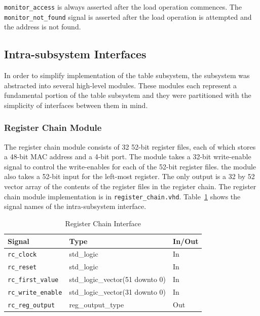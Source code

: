 \documentclass{article}
\begin{document}
\texttt{monitor\_access} is always asserted after the load operation commences. The \texttt{monitor\_not\_found} signal is asserted after the load operation is attempted and the address is not found.

\subsection{Intra-subsystem Interfaces}

In order to simplify implementation of the table subsystem, the subsystem was abstracted into several high-level modules. These modules each represent a fundamental portion of the table subsystem and they were partitioned with the simplicity of interfaces between them in mind. 

\newpage
\subsubsection{Register Chain Module}

The register chain module consists of 32 52-bit register files, each of which stores a 48-bit MAC address and a 4-bit port. The module takes a 32-bit write-enable signal to control the write-enables for each of the 52-bit register files. the module also takes a 52-bit input for the left-most register. The only output is a 32 by 52 vector array of the contents of the register files in the register chain. The register chain module implementation is in \texttt{register\_chain.vhd}. Table~\ref{tab:reg} shows the signal names of the intra-subsystem interface. 


\begin{table}[ht]
    \begin{center}
        \begin{tabular}{lll}\hline
        Signal & Type & In/Out \\
        \hline
        \texttt{rc\_clock} & std\_logic & In \\
        \hline
        \texttt{rc\_reset} & std\_logic & In \\
        \hline
        \texttt{rc\_first\_value} & std\_logic\_vector(51 downto 0) & In \\
        \hline
        \texttt{rc\_write\_enable} & std\_logic\_vector(31 downto 0) & In \\
        \hline
        \texttt{rc\_reg\_output} & reg\_output\_type & Out \\
        \hline
        \end{tabular}
        \caption{Register Chain Interface}\label{tab:reg}
    \end{center}
\end{table}
\end{document}

